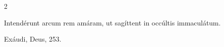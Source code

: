 \documentclass[9pt,twoside]{extarticle}
\begin{document}
\begin{multicols}{2}
%
%
%
%
%
%
%
%
%
%
%
%
%
%
%

\begin{tightlist}{}
\item {} Intendérunt arcum rem amáram, ut sagíttent in occúltis immaculátum.
\item {} Exáudi, Deus, 253.
\end{tightlist}

%
%
%
%
%
%
%
%
%
%
%
%


\end{multicols}
\end{document}
